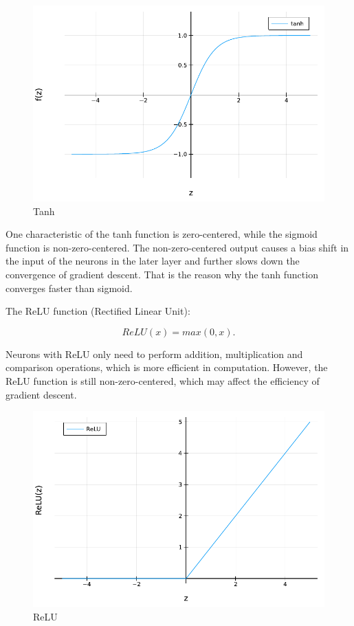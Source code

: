 \documentclass[
	parskip, 			   %
	twoside, 			   %
	DIV=14, 			   %
	BCOR=15.0mm, 		   %
	headsepline, 		   %
	open=right, 		   %
	captions=tableheading, %
	bibliography=totoc,    %
	numbers=noenddot       %
]{scrreprt}
\begin{document}
\begin{figure}[h!]
    \centering
    \includegraphics[scale=0.7]{figures/tanh.pdf}
    \caption{Tanh}
    \label{fig:tanh}
\end{figure}

One characteristic of the tanh function is zero-centered, while the sigmoid function is non-zero-centered. The non-zero-centered output causes a bias shift in the input of the neurons in the later layer and further slows down the convergence of gradient descent. That is the reason why the tanh function converges faster than sigmoid.

The ReLU function (Rectified Linear Unit):

\begin{equation}
    \label{eq:ReLU}
    ReLU(x) = max(0,x).
\end{equation}

Neurons with ReLU only need to perform addition, multiplication and comparison operations, which is more efficient in computation. However, the ReLU function is still non-zero-centered, which may affect the efficiency of gradient descent. 

\begin{figure}[h!]
    \centering
    \includegraphics[scale=0.7]{figures/ReLU.pdf}
    \caption{ReLU}
    \label{fig:ReLU}
\end{figure}
\end{document}
